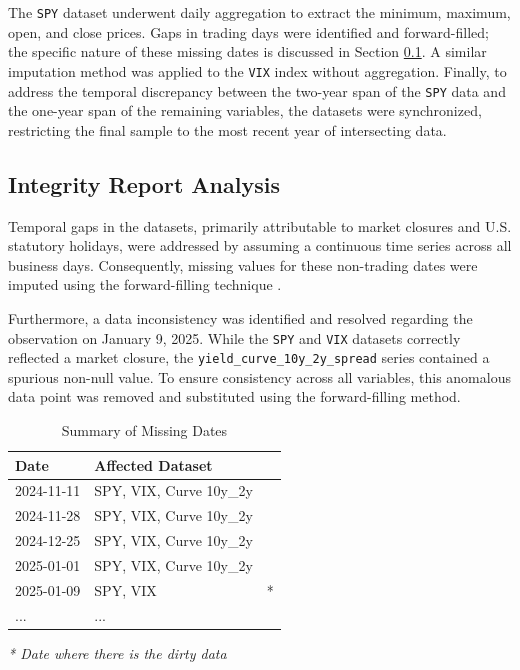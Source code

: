 \documentclass[a4paper,fleqn]{cas-sc}
\begin{document}
The \texttt{SPY} dataset underwent daily aggregation to extract the minimum, maximum, open, and close prices. Gaps in trading days were identified and forward-filled; the specific nature of these missing dates is discussed in Section \ref{sec:integrity_analysis}. A similar imputation method was applied to the \texttt{VIX} index without aggregation. Finally, to address the temporal discrepancy between the two-year span of the \texttt{SPY} data and the one-year span of the remaining variables, the datasets were synchronized, restricting the final sample to the most recent year of intersecting data.

\subsection{Integrity Report Analysis} \label{sec:integrity_analysis}
Temporal gaps in the datasets, primarily attributable to market closures and U.S. statutory holidays, were addressed by assuming a continuous time series across all business days. Consequently, missing values for these non-trading dates were imputed using the forward-filling technique \cite{team1_validation}.

Furthermore, a data inconsistency was identified and resolved regarding the observation on January 9, 2025. While the \texttt{SPY} and \texttt{VIX} datasets correctly reflected a market closure, the \texttt{yield\_curve\_10y\_2y\_spread} series contained a spurious non-null value. To ensure consistency across all variables, this anomalous data point was removed and substituted using the forward-filling method.

\begin{table}[htbp]
  \caption{Summary of Missing Dates}
  \label{tab:integrity_report}
  \centering
  \begin{tabular}{llc}
    \toprule
    \textbf{Date} & \textbf{Affected Dataset} & \\
    \midrule
    2024-11-11 & SPY, VIX, Curve 10y\_2y  & \\
    2024-11-28 & SPY, VIX, Curve 10y\_2y & \\
    2024-12-25 & SPY, VIX, Curve 10y\_2y & \\
    2025-01-01 & SPY, VIX, Curve 10y\_2y & \\
    2025-01-09 & SPY, VIX  & * \\
    ... & ... & \\
    \bottomrule
  \end{tabular}
  \par\bigskip
  \footnotesize{\textit{* Date where there is the dirty data}}
\end{table}
\end{document}
